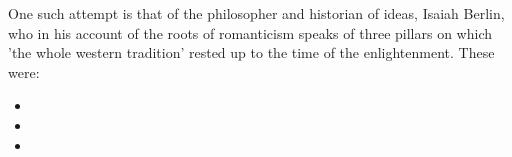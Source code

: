 One such attempt is that of the philosopher and historian of ideas, Isaiah Berlin, who in his account of the roots of romanticism speaks of three pillars on which 'the whole western tradition' rested up to the time of the enlightenment.
These were:

\begin{itemize}
\item
  \item
    \item
\end{itemize}
  




